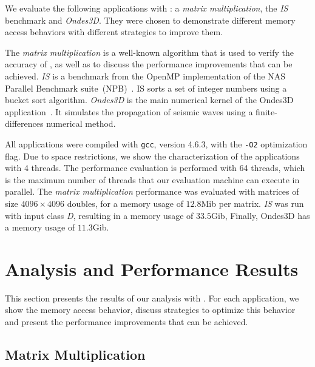 We evaluate the following applications with \TABARNAC: a \emph{matrix multiplication}, the \emph{IS} benchmark and \emph{Ondes3D}.
They were chosen to demonstrate different memory access behaviors with different strategies to improve them.

The \emph{matrix multiplication} is a well-known algorithm that is used to verify the accuracy of \TABARNAC, as well as to discuss the performance improvements that can be achieved.
\emph{IS} is a benchmark from the OpenMP implementation of the NAS Parallel Benchmark suite~(NPB)~\cite{Jin1999}. IS sorts a set of integer numbers using a bucket sort algorithm.
\emph{Ondes3D} is the main numerical kernel of the Ondes3D application~\cite{Dupros2008}. It simulates the propagation of seismic waves using a finite-differences numerical method.

All applications were compiled with \texttt{gcc}, version 4.6.3, with the \texttt{-O2} optimization flag.
Due to space restrictions, we show the characterization of the applications
with 4 threads.  The performance evaluation is performed with 64 threads,
which is the maximum number of threads that our evaluation machine can execute
in parallel.  The \emph{matrix multiplication} performance was evaluated with
matrices of size $4096 \times 4096$ doubles, for a memory usage of $12.8$Mib per matrix. \emph{IS} was run
with input class \emph{D}, resulting in a memory usage of $33.5$Gib, Finally, Ondes3D has a memory usage of $11.3$Gib.

\section{Analysis and Performance Results}
\label{sec:expe-analysis}

This section presents the results of our analysis with \TABARNAC.
For each application, we show the memory access behavior, discuss strategies to optimize this behavior and present the performance improvements that can be achieved.


\subsection{Matrix Multiplication}
\label{sec:exp-mat}

